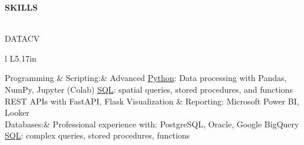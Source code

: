 \documentclass[letterpaper]{article}
\newcommand{\lineunder} {
        \vspace*{-8pt} \\
        \hspace*{-18pt} \hrulefill \\
    }
\newcommand{\header} [1] {
        \vspace{9pt}
        {\hspace*{-18pt}\vspace*{6pt} \large \textbf {#1}}
        \vspace*{-6pt} \lineunder
        \vspace{2pt}
    }
\newenvironment{skillslist}
        {
            \hspace*{-0.07in}\begin{tabular}[t]{ l L{5.17in} }
        }{
            \end{tabular}
        }
\newcommand{\impt}[1]{\uline{#1}}
\begin{document}

\header{SKILLS}
    \begin{taggedblock}{DATACV}
        \begin{skillslist}
            Programming \& Scripting:&
                Advanced \impt{Python}: Data processing with Pandas, NumPy, Jupyter (Colab) \linebreak
                \impt{SQL}: spatial queries, stored procedures, and functions \linebreak
                REST APIs with FastAPI, Flask \linebreak
                Visualization \& Reporting: Microsoft Power BI, Looker \linebreak
                \\
            Databases:&
                Professional experience with: PostgreSQL, Oracle, Google BigQuery \linebreak
                \impt{SQL}: complex queries, stored procedures, functions \linebreak

\end{skillslist}
\end{taggedblock}
\end{document}
